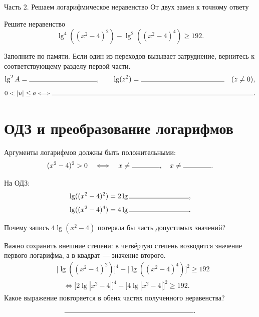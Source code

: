 \worksheettitle
  {Часть 2. Решаем логарифмическое неравенство}
  {От двух замен к точному ответу}
\studentnameblock

\begin{problembox}
  Решите неравенство
  \[
    \lg^4((x^2-4)^2)-\lg^2((x^2-4)^4)\ge192.
  \]
\end{problembox}

\begin{checkpointbox}
  Заполните по памяти. Если один из переходов вызывает затруднение,
  вернитесь к соответствующему разделу первой части.
  \[
    \lg^2 A=\answerblank[34mm],
    \qquad
    \lg(z^2)=\answerblank[42mm]\quad(z\ne0),
  \]
  \[
    0<|u|\le a
    \Longleftrightarrow
    \answerblank[108mm].
  \]
\end{checkpointbox}

\section{ОДЗ и преобразование логарифмов}

Аргументы логарифмов должны быть положительными:
\[
  (x^2-4)^2>0
  \quad\Longleftrightarrow\quad
  x\ne\answerblank[14mm],\quad x\ne\answerblank[14mm].
\]

На ОДЗ:
\[
  \lg((x^2-4)^2)=2\lg\answerblank[30mm],
\]
\[
  \lg((x^2-4)^4)=4\lg\answerblank[30mm].
\]
\newpage
\begin{reflectionbox}
  Почему запись \(4\lg(x^2-4)\) потеряла бы часть допустимых значений?
\end{reflectionbox}

\begin{fillbox}
  Важно сохранить внешние степени: в четвёртую степень возводится значение
  первого логарифма, а в квадрат --- значение второго.
  \[
    \begin{aligned}
      &\bigl[\lg((x^2-4)^2)\bigr]^4
      -\bigl[\lg((x^2-4)^4)\bigr]^2\ge192\\
      &\quad\Longleftrightarrow
      \bigl[2\lg|x^2-4|\bigr]^4
      -\bigl[4\lg|x^2-4|\bigr]^2\ge192.
    \end{aligned}
  \]
  Какое выражение повторяется в обеих частях полученного неравенства?
  \[
    \answerblank[65mm].
  \]
\end{fillbox}

